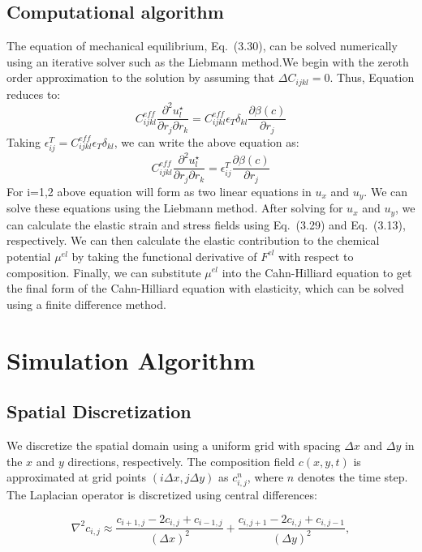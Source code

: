 \subsection{Computational algorithm}
The equation of mechanical equilibrium, Eq.~(3.30), can be solved numerically using an iterative solver such as the Liebmann method.We begin with the zeroth order approximation to the solution by assuming that $\Delta C_{ijkl} = 0$. Thus, Equation reduces to:
\begin{equation}
C_{ijkl}^{eff}\frac{\partial^2 u^{\star}_l}{\partial r_j \partial r_k} = C_{ijkl}^{eff}\epsilon_T\delta_{kl}\frac{\partial\beta(c)}{\partial r_j}
\end{equation}
Taking $\epsilon_{ij}^T=C_{ijkl}^{eff}\epsilon_T\delta_{kl}$, we can write the above equation as:
\begin{equation}
C_{ijkl}^{eff}\frac{\partial^2 u^{\star}_l}{\partial r_j \partial r_k} = \epsilon_{ij}^T\frac{\partial\beta(c)}{\partial r_j}
\end{equation}
For i=1,2 above equation will form as two linear equations in $u_x$ and $u_y$. We can solve these equations using the Liebmann method. After solving for $u_x$ and $u_y$, we can calculate the elastic strain and stress fields using Eq.~(3.29) and Eq.~(3.13), respectively. We can then calculate the elastic contribution to the chemical potential $\mu^{el}$ by taking the functional derivative of $F^{el}$ with respect to composition. Finally, we can substitute $\mu^{el}$ into the Cahn-Hilliard equation to get the final form of the Cahn-Hilliard equation with elasticity, which can be solved using a finite difference method.
\section{Simulation Algorithm}

\subsection{Spatial Discretization}

We discretize the spatial domain using a uniform grid with spacing $\Delta x$ and $\Delta y$ in the $x$ and $y$ directions, respectively. The composition field $c(x,y,t)$ is approximated at grid points $(i\Delta x, j\Delta y)$ as $c_{i,j}^n$, where $n$ denotes the time step. The Laplacian operator is discretized using central differences:

\begin{equation}\label{eq:fd_laplacian}
\nabla^2 c_{i,j} \approx \frac{c_{i+1,j} - 2c_{i,j} + c_{i-1,j}}{(\Delta x)^2} + \frac{c_{i,j+1} - 2c_{i,j} + c_{i,j-1}}{(\Delta y)^2},
\end{equation}

